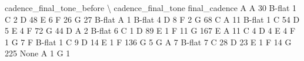 \documentclass[letterpaper,10pt,english]{sphinxmanual}
\begin{document}
{\begin{sphinxVerbatim}[commandchars=\\\{\}]
                                  cadence\_final\_tone\_before  \textbackslash{}
cadence\_final\_tone final\_cadence
A                  A                                     30
                   B-flat                                 1
                   C                                      2
                   D                                     48
                   E                                      6
                   F                                     26
                   G                                     27
B-flat             A                                      1
                   B-flat                                 4
                   D                                      8
                   F                                      2
                   G                                     68
C                  A                                     11
                   B-flat                                 1
                   C                                     54
                   D                                      5
                   E                                      4
                   F                                     72
                   G                                     44
D                  A                                      2
                   B-flat                                 6
                   C                                      1
                   D                                     89
                   E                                      1
                   F                                     11
                   G                                    167
E                  A                                     11
                   C                                      4
                   D                                      4
                   E                                      4
                   F                                      1
                   G                                      7
F                  B-flat                                 1
                   C                                      9
                   D                                     14
                   E                                      1
                   F                                    136
                   G                                      5
G                  A                                      7
                   B-flat                                 7
                   C                                     28
                   D                                     23
                   E                                      1
                   F                                     14
                   G                                    225
None               A                                      1
                   G                                      1


\end{sphinxVerbatim}}
\end{document}
